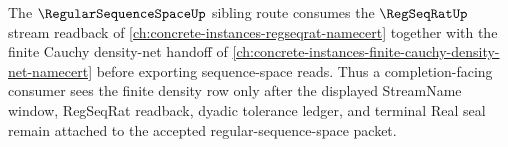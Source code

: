 The $\RegularSequenceSpaceUp$ sibling route consumes the $\RegSeqRatUp$ stream readback of \autoref{ch:concrete-instances-regseqrat-namecert} together with the finite Cauchy density-net handoff of \autoref{ch:concrete-instances-finite-cauchy-density-net-namecert} before exporting sequence-space reads. Thus a completion-facing consumer sees the finite density row only after the displayed StreamName window, RegSeqRat readback, dyadic tolerance ledger, and terminal Real seal remain attached to the accepted regular-sequence-space packet.
